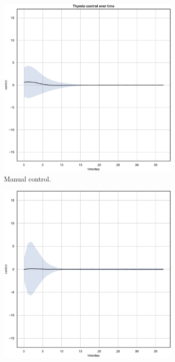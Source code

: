 \begin{figure}[!htb]\ContinuedFloat
	\begin{center}
		\begin{subfigure}[h]{0.35\textwidth}			
			\includegraphics[width=\textwidth]{contents/images/net-d1/control-overtime-manual}%
			\caption{Manual control.}
		\end{subfigure}
		\hspace{1cm}
		\begin{subfigure}[h]{0.35\textwidth}
			\includegraphics[width=\textwidth]{contents/images/net-c1/control-overtime-learned_communication}

\end{subfigure}
\end{center}
\end{figure}
